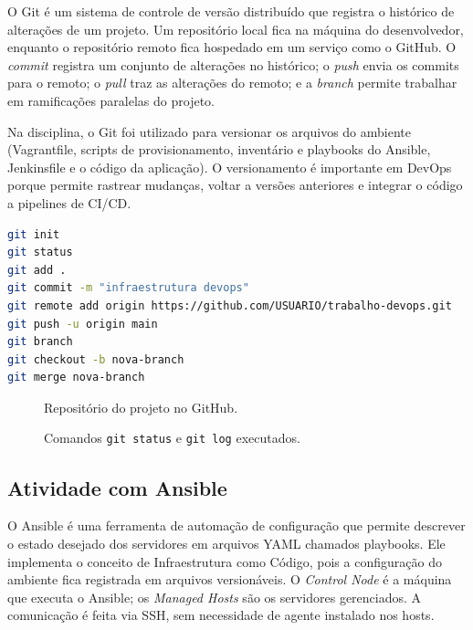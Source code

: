\documentclass[12pt,a4paper]{article}
\begin{document}
O Git \'e um sistema de controle de vers\~ao distribu\'ido que registra o
hist\'orico de altera\c{c}\~oes de um projeto. Um reposit\'orio local fica na
m\'aquina do desenvolvedor, enquanto o reposit\'orio remoto fica hospedado em um
servi\c{c}o como o GitHub. O \textit{commit} registra um conjunto de altera\c{c}\~oes
no hist\'orico; o \textit{push} envia os commits para o remoto; o \textit{pull}
traz as altera\c{c}\~oes do remoto; e a \textit{branch} permite trabalhar em
ramifica\c{c}\~oes paralelas do projeto.

Na disciplina, o Git foi utilizado para versionar os arquivos do ambiente
(Vagrantfile, scripts de provisionamento, invent\'ario e playbooks do Ansible,
Jenkinsfile e o c\'odigo da aplica\c{c}\~ao). O versionamento \'e importante em
DevOps porque permite rastrear mudan\c{c}as, voltar a vers\~oes anteriores e
integrar o c\'odigo a pipelines de CI/CD.

\begin{lstlisting}[language=bash,caption={Comandos do Git utilizados}]
git init
git status
git add .
git commit -m "infraestrutura devops"
git remote add origin https://github.com/USUARIO/trabalho-devops.git
git push -u origin main
git branch
git checkout -b nova-branch
git merge nova-branch
\end{lstlisting}

\begin{figure}[htbp]
  \centering
  \caption{Reposit\'orio do projeto no GitHub.}
\end{figure}

\begin{figure}[htbp]
  \centering
  \caption{Comandos \texttt{git status} e \texttt{git log} executados.}
\end{figure}

\subsection{Atividade com Ansible}

O Ansible \'e uma ferramenta de automa\c{c}\~ao de configura\c{c}\~ao que permite
descrever o estado desejado dos servidores em arquivos YAML chamados playbooks.
Ele implementa o conceito de Infraestrutura como C\'odigo, pois a configura\c{c}\~ao
do ambiente fica registrada em arquivos version\'aveis. O \textit{Control Node} \'e
a m\'aquina que executa o Ansible; os \textit{Managed Hosts} s\~ao os servidores
gerenciados. A comunica\c{c}\~ao \'e feita via SSH, sem necessidade de agente
instalado nos hosts.
\end{document}
